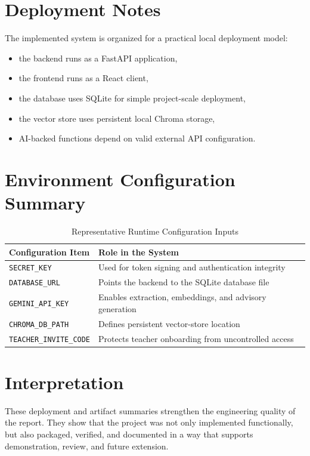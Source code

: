 \section{Deployment Notes}
The implemented system is organized for a practical local deployment model:
\begin{itemize}[leftmargin=*]
\item the backend runs as a FastAPI application,
\item the frontend runs as a React client,
\item the database uses SQLite for simple project-scale deployment,
\item the vector store uses persistent local Chroma storage,
\item AI-backed functions depend on valid external API configuration.
\end{itemize}

\section{Environment Configuration Summary}
\begin{table}[H]
\centering
\caption{Representative Runtime Configuration Inputs}
\begin{tabularx}{\textwidth}{>{\raggedright\arraybackslash}p{} >{\raggedright\arraybackslash}X}
\toprule
\textbf{Configuration Item} & \textbf{Role in the System} \\
\midrule
\texttt{SECRET\_KEY} & Used for token signing and authentication integrity \\
\texttt{DATABASE\_URL} & Points the backend to the SQLite database file \\
\texttt{GEMINI\_API\_KEY} & Enables extraction, embeddings, and advisory generation \\
\texttt{CHROMA\_DB\_PATH} & Defines persistent vector-store location \\
\texttt{TEACHER\_INVITE\_CODE} & Protects teacher onboarding from uncontrolled access \\
\bottomrule
\end{tabularx}
\end{table}

\section{Interpretation}
These deployment and artifact summaries strengthen the engineering quality of the report. They show that the project was not only implemented functionally, but also packaged, verified, and documented in a way that supports demonstration, review, and future extension.
